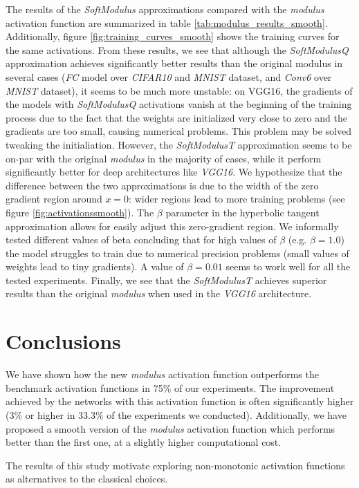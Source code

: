 The results of the \textit{SoftModulus} approximations compared with the \textit{modulus} activation function are summarized in table \ref{tab:modulus_results_smooth}. Additionally, figure \ref{fig:training_curves_smooth} shows the training curves for the same activations. From these results, we see that although the \textit{SoftModulusQ} approximation achieves significantly better results than the original modulus in several cases (\textit{FC} model over \textit{CIFAR10} and \textit{MNIST} dataset, and \textit{Conv6} over \textit{MNIST} dataset), it seems to be much more unstable: on VGG16, the gradients of the models with \textit{SoftModulusQ} activations vanish at the beginning of the training process due to the fact that the weights are initialized very close to zero and the gradients are too small, causing numerical problems. This problem may be solved tweaking the initialiation. However, the \textit{SoftModulusT} approximation seems to be on-par with the original \textit{modulus} in the majority of cases, while it perform significantly better for deep architectures like \textit{VGG16}. We hypothesize that the difference between the two approximations is due to the width of the zero gradient region around $x=0$: wider regions lead to more training problems (see figure \ref{fig:activationssmooth}). The $\beta$ parameter in the hyperbolic tangent approximation allows for easily adjust this zero-gradient region. We informally tested different values of beta concluding that for high values of $\beta$ (e.g. $\beta=1.0$) the model struggles to train due to numerical precision problems (small values of weights lead to tiny gradients). A value of $\beta=0.01$ seems to work well for all the tested experiments. Finally, we see that the \textit{SoftModulusT} achieves superior results than the original \textit{modulus} when used in the \textit{VGG16} architecture.




\section{Conclusions} \label{sec:modulus_conclusions}
We have shown how the new \textit{modulus} activation function outperforms the benchmark activation functions in 75\% of our experiments. The improvement achieved by the networks with this activation function is often significantly higher ($3\%$ or higher in 33.3$\%$ of the experiments we conducted). Additionally, we have proposed a smooth version of the \textit{modulus} activation function which performs better than the first one, at a slightly higher computational cost.

The results of this study motivate exploring non-monotonic activation functions as alternatives to the classical choices.




